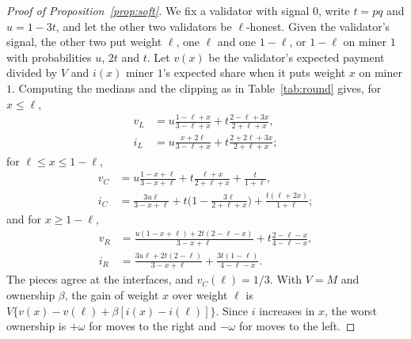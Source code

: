 \documentclass[sigconf,anonymous,review]{acmart}
\numberwithin{equation}{section}
\begin{document}
\begin{proof}[Proof of Proposition~\ref{prop:soft}]
We fix a validator with signal $0$, write $t=pq$ and $u=1-3t$, and let the
other two validators be $\ell$-honest. Given the validator's signal, the other
two put weight $\ell$, one $\ell$ and one $1-\ell$, or $1-\ell$ on miner $1$
with probabilities $u$, $2t$ and $t$. Let $v(x)$ be the validator's expected
payment divided by $V$ and $i(x)$ miner $1$'s expected share when it puts weight
$x$ on miner $1$. Computing the medians and the clipping as in
Table~\ref{tab:round} gives, for $x\le\ell$,
\begin{align*}
v_L&=u\tfrac{1-\ell+x}{3-\ell+x}+t\tfrac{2-\ell+3x}{2+\ell+x},\\
i_L&=u\tfrac{x+2\ell}{3-\ell+x}+t\tfrac{2+2\ell+3x}{2+\ell+x};
\end{align*}
for $\ell\le x\le1-\ell$,
\begin{align*}
v_C&=u\tfrac{1-x+\ell}{3-x+\ell}+t\tfrac{\ell+x}{2+\ell+x}+\tfrac{t}{1+\ell},\\
i_C&=\tfrac{3u\ell}{3-x+\ell}+t\bigl(1-\tfrac{3\ell}{2+\ell+x}\bigr)+\tfrac{t(\ell+2x)}{1+\ell};
\end{align*}
and for $x\ge1-\ell$,
\begin{align*}
v_R&=\tfrac{u(1-x+\ell)+2t(2-\ell-x)}{3-x+\ell}+t\tfrac{2-\ell-x}{4-\ell-x},\\
i_R&=\tfrac{3u\ell+2t(2-\ell)}{3-x+\ell}+\tfrac{3t(1-\ell)}{4-\ell-x}.
\end{align*}
The pieces agree at the interfaces, and $v_C(\ell)=1/3$. With $V=M$ and
ownership $\beta$, the gain of weight $x$ over weight $\ell$ is
$V\{v(x)-v(\ell)+\beta[i(x)-i(\ell)]\}$. Since $i$ increases in $x$, the worst
ownership is $+\omega$ for moves to the right and $-\omega$ for moves to the
left.


\end{proof}
\end{document}
